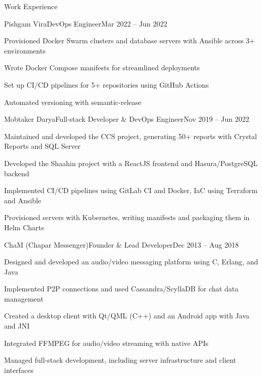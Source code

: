 \documentclass[]{main}
\begin{document}
\begin{section}{Work Experience}
 \begin{subsection}{Pishgam Vira}{DevOps Engineer}{Mar 2022 -- Jun 2022}{}
     \item Provisioned Docker Swarm clusters and database servers with Ansible across 3+ environments
     \item Wrote Docker Compose manifests for streamlined deployments
     \item Set up CI/CD pipelines for 5+ repositories using GitHub Actions
     \item Automated versioning with semantic-release
 \end{subsection}

 \begin{subsection}{Mobtaker Darya}{Full-stack Developer \& DevOps Engineer}{Nov 2019 -- Jun 2022}{}
     \item Maintained and developed the CCS project, generating 50+ reports with Crystal Reports and SQL Server
     \item Developed the Shaahin project with a ReactJS frontend and Hasura/PostgreSQL backend
     \item Implemented CI/CD pipelines using GitLab CI and Docker, IaC using Terraform and Ansible
     \item Provisioned servers with Kubernetes, writing manifests and packaging them in Helm Charts
 \end{subsection}

 \begin{subsection}{ChaM (Chapar Messenger)}{Founder \& Lead Developer}{Dec 2013 -- Aug 2018}{}
     \item Designed and developed an audio/video messaging platform using C, Erlang, and Java
     \item Implemented P2P connections and used Cassandra/ScyllaDB for chat data management
     \item Created a desktop client with Qt/QML (C++) and an Android app with Java and JNI
     \item Integrated FFMPEG for audio/video streaming with native APIs
     \item Managed full-stack development, including server infrastructure and client interfaces
 \end{subsection}
\end{section}

\end{document}
